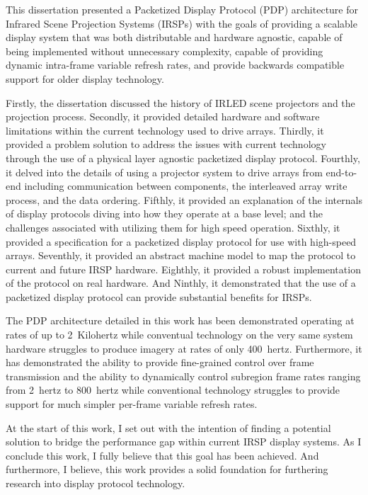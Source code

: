 \label{chap:conclusion}
This dissertation presented a Packetized Display Protocol (PDP) architecture for Infrared Scene Projection Systems (IRSPs) with the goals of providing a scalable display system that was both distributable and hardware agnostic, capable of being implemented without unnecessary complexity, capable of providing dynamic intra-frame variable refresh rates, and provide backwards compatible support for older display technology.

Firstly, the dissertation discussed the history of IRLED scene projectors and the projection process. Secondly, it provided detailed hardware and software limitations within the current technology used to drive arrays. Thirdly, it provided a problem solution to address the issues with current technology through the use of a  physical layer agnostic packetized display protocol. Fourthly, it delved into the details of using a projector system to drive arrays from end-to-end including communication between components, the interleaved array write process, and the data ordering. Fifthly, it provided an explanation of the internals of display protocols diving into how they operate at a base level; and the challenges associated with utilizing them for high speed operation. Sixthly, it provided a specification for a packetized display protocol for use with high-speed arrays. Seventhly, it provided an abstract machine model to map the protocol to current and future IRSP hardware. Eighthly, it provided a robust implementation of the protocol on real hardware. And Ninthly, it demonstrated that the use of a packetized display protocol can provide substantial benefits for IRSPs.

The PDP architecture detailed in this work has been demonstrated operating at rates of up to \mbox{2 Kilohertz} while conventual technology on the very same system hardware struggles to produce imagery at rates of only \mbox{400 hertz}. Furthermore, it has demonstrated the ability to provide fine-grained control over frame transmission and the ability to dynamically control subregion frame rates ranging from \mbox{2 hertz} to \mbox{800 hertz} while conventional technology struggles to provide support for much simpler per-frame variable refresh rates.

At the start of this work, I set out with the intention of finding a potential solution to bridge the performance gap within current IRSP display systems. As I conclude this work, I fully believe that this goal has been achieved. And furthermore, I believe, this work provides a solid foundation for furthering research into display protocol technology.

